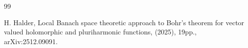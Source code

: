 \documentclass[a4paper,11pt, reqno]{amsart}
\theoremstyle{definition}
\begin{document}
\begin{thebibliography}{99}
	
	
	
	
	
	
	
	
	
	
	 {\sc H. Halder}, Local Banach space theoretic approach to Bohr's theorem for vector valued holomorphic and pluriharmonic functions, (2025), 19pp., arXiv:2512.09091.
	
	
	

\end{thebibliography}
\end{document}
